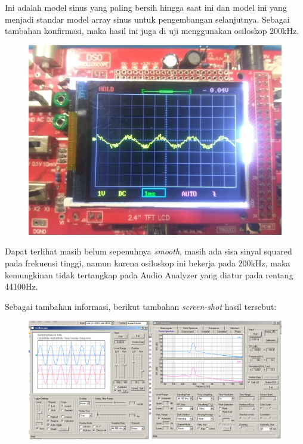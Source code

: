 \documentclass[12pt,]{article}
\begin{document}
  	Ini adalah model sinus yang paling bersih hingga saat ini
  	dan model ini yang menjadi standar model array sinus untuk pengembangan selanjutnya.
  	Sebagai tambahan konfirmasi, maka hasil ini juga di uji menggunakan osiloskop 200kHz.
  	\begin{figure}[H]
  		\centering
  		\includegraphics[width=0.45\linewidth]{result/day_4/goodsine}
  	\end{figure} 
  	Dapat terlihat masih belum sepenuhnya \textit{smooth},
  	masih ada sisa sinyal squared pada frekuensi tinggi,
  	namun karena osiloskop ini bekerja pada 200kHz,
  	maka kemungkinan tidak tertangkap pada Audio Analyzer yang diatur pada rentang 44100Hz.
  	
  	\newpage
  	Sebagai tambahan informasi, berikut tambahan \textit{screen-shot} hasil tersebut:
  	\begin{figure}[H]
  		\centering
  		\includegraphics[width=0.9\linewidth]{result/day_4/BestResult}
  	\end{figure}
  
\end{document}
